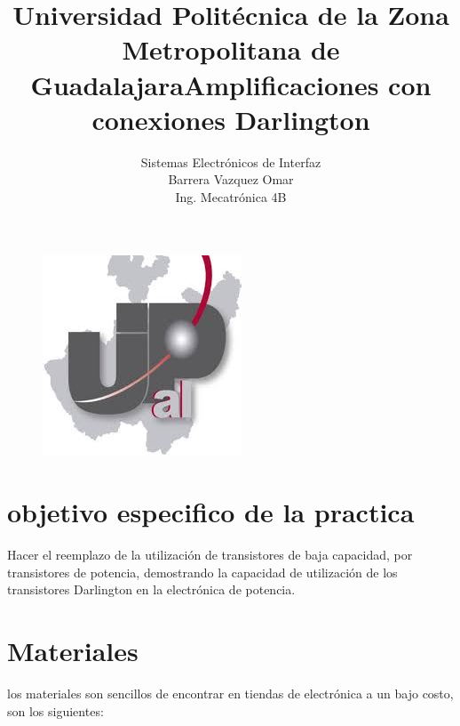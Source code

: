 \documentclass[11pt,a4paper]{article}
\title{Universidad Politécnica de la Zona Metropolitana de Guadalajara}
\begin{document}
\maketitle

\begin{figure}[h]
\begin{center}
\includegraphics[scale=1]{1.jpeg}
\end{center}
\end{figure}


\begin{center}
\title{Amplificaciones con conexiones Darlington\\}
\author{Sistemas Electrónicos de Interfaz\\
Barrera Vazquez Omar\\
Ing. Mecatrónica 4B}
\end{center}


\newpage

\section{objetivo especifico de la practica}
Hacer el reemplazo de la utilización de transistores de baja capacidad, por transistores de potencia, demostrando la capacidad de utilización de los transistores Darlington en la electrónica de potencia.


\section{Materiales}

los materiales son sencillos de encontrar en tiendas de electrónica a un bajo costo, son los siguientes:
\end{document}
